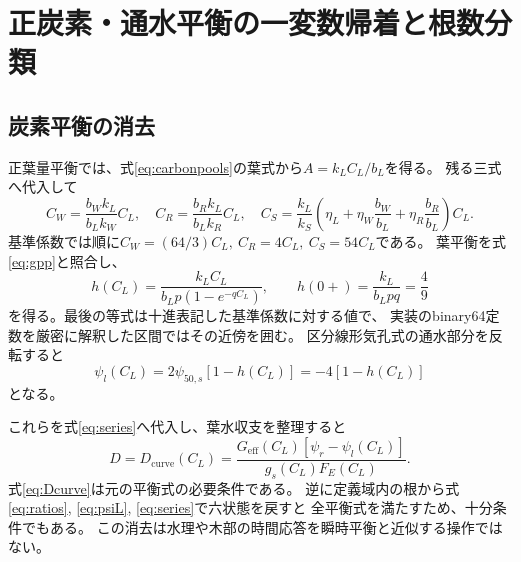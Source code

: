 \documentclass[a4paper,11pt]{ltjsarticle}
\begin{document}
\section{正炭素・通水平衡の一変数帰着と根数分類}\label{sec:scalar}
\subsection{炭素平衡の消去}
正葉量平衡では、式\eqref{eq:carbonpools}の葉式から$A=k_LC_L/b_L$を得る。
残る三式へ代入して
\begin{equation}\label{eq:ratios}
 C_W=\frac{b_Wk_L}{b_Lk_W}C_L,\quad
 C_R=\frac{b_Rk_L}{b_Lk_R}C_L,\quad
 C_S=\frac{k_L}{k_S}\left(\eta_L+\eta_W\frac{b_W}{b_L}
                                  +\eta_R\frac{b_R}{b_L}\right)C_L .
\end{equation}
基準係数では順に$C_W=(64/3)C_L,\ C_R=4C_L,\ C_S=54C_L$である。
葉平衡を式\eqref{eq:gpp}と照合し、
\begin{equation}\label{eq:hL}
 h(C_L)=\frac{k_LC_L}{b_Lp(1-e^{-qC_L})},\qquad
 h(0+)=\frac{k_L}{b_Lpq}=\frac49
\end{equation}
を得る。最後の等式は十進表記した基準係数に対する値で、
実装のbinary64定数を厳密に解釈した区間ではその近傍を囲む。
区分線形気孔式の通水部分を反転すると
\begin{equation}\label{eq:psiL}
 \psi_l(C_L)=2\psi_{50,s}[1-h(C_L)]=-4[1-h(C_L)]
\end{equation}
となる。

これらを式\eqref{eq:series}へ代入し、葉水収支を整理すると
\begin{equation}\label{eq:Dcurve}
 \boxed{D=D_{\mathrm{curve}}(C_L)
 =\frac{G_{\mathrm{eff}}(C_L)[\psi_r-\psi_l(C_L)]}{g_s(C_L)F_E(C_L)}} .
\end{equation}
式\eqref{eq:Dcurve}は元の平衡式の必要条件である。
逆に定義域内の根から式\eqref{eq:ratios}, \eqref{eq:psiL}, \eqref{eq:series}で六状態を戻すと
全平衡式を満たすため、十分条件でもある。
この消去は水理や木部の時間応答を瞬時平衡と近似する操作ではない。
\end{document}
